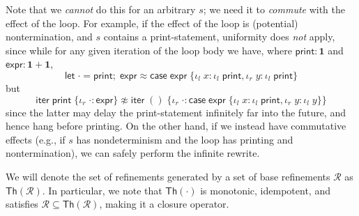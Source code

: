 \documentclass[acmsmall,screen,review]{acmart}
\newcommand{\mc}[1]{\ensuremath{\mathcal{#1}}}
\newcommand{\mb}[1]{\ensuremath{\mathbf{#1}}}
\newcommand{\ms}[1]{\ensuremath{\mathsf{#1}}}
\newcommand{\lto}{:}
\newcommand{\linl}[1]{\iota_l\;{#1}}
\newcommand{\linr}[1]{\iota_r\;{#1}}
\newcommand{\letexpr}[3]{\ensuremath{\ms{let}\;#1 = #2;\;#3}}
\newcommand{\caseexpr}[5]{\ms{case}\;#1\;\{\linl{#2} \lto #3, \linr{#4} \lto #5\}}
\newcommand{\liter}[3]{\ms{iter}\;#1\;\{ \linr{#2} \lto #3 \}}
\begin{document}
Note that we \emph{cannot} do this for an arbitrary $s$; we need it to \emph{commute} with the
effect of the loop. For example, if the effect of the loop is (potential) nontermination, and $s$
contains a print-statement, uniformity does \emph{not} apply, since while for any given iteration of
the loop body we have, where $\ms{print}: \mb{1}$ and $\ms{expr}: \mb{1} + \mb{1}$,
$$
\letexpr{\cdot}{\ms{print}}{\ms{expr}} \approx
\caseexpr{\ms{expr}}
  {x}{{\linl{\ms{print}}}}
  {y}{{\linl{\ms{print}}}}
$$
but
$$
\liter{\ms{print}}{\cdot}{\ms{expr}} \not\approx
\liter{()}{\cdot}{\caseexpr{\ms{expr}}
  {x}{\linl{\ms{print}}}{y}{\linl{y}}}
$$
since the latter may delay the print-statement infinitely far into the future, and hence hang before
printing. On the other hand, if we instead have commutative effects (e.g., if $s$ has nondeterminism
and the loop has printing and nontermination), we can safely perform the infinite rewrite.

We will denote the set of refinements generated by a set of base refinements $\mc{R}$ as
$\ms{Th}(\mc{R})$. In particular, we note that $\ms{Th}(\cdot)$ is monotonic, idempotent, and
satisfies $\mc{R} \subseteq \ms{Th}(\mc{R})$, making it a closure operator.
\end{document}
